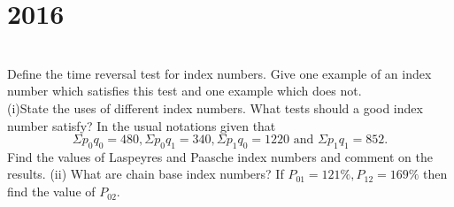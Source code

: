 \section*{2016}
\vspace{-.5cm}
\hrulefill \smallskip\\
 Define the time reversal test for index numbers. Give one example of an index number which satisfies this test and one example which does not.
\myline
{} \\
(i)State the uses of different index numbers. What tests should a good index number satisfy? In the usual notations given that \[ \Sigma p_0q_0 = 480, \Sigma p_0q_1 = 340, \Sigma p_1q_0 = 1220 \text{ and } \Sigma p_1q_1 = 852.\]  Find the values of Laspeyres and Paasche index numbers and comment on the results.
(ii) What are chain base index numbers? If $P_{01} = 121\%, P_{12} = 169\%$ then find the value of $P_{02}.$
